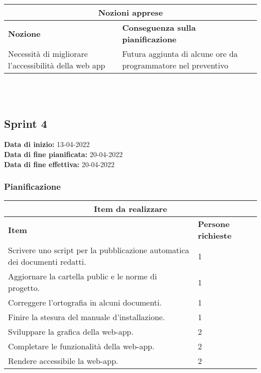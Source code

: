 \documentclass[a4paper, 12pt]{article}
\begin{document}
\begin{center}
    \begin{tabularx}{\textwidth}{|X|X|}
        \hline
        \multicolumn{2}{|c|}{\textbf{Nozioni apprese}}\\
        \hline
        \hline
        \textbf{Nozione} & \textbf{Conseguenza sulla pianificazione}\\
        \hline
        Necessità di migliorare l'accessibilità della web app & Futura aggiunta di alcune ore da programmatore nel preventivo \\
        \hline
    \end{tabularx}\\[8pt]
    \mbox{}\\
\end{center}

\subsection{Sprint 4}
\textbf{Data di inizio:} 13-04-2022\\
\textbf{Data di fine pianificata:} 20-04-2022\\
\textbf{Data di fine effettiva:} 20-04-2022

\subsubsection{Pianificazione}\mbox{}

\begin{center}
    \begin{tabularx}{\textwidth}{|X|X|}
        \hline
        \multicolumn{2}{|c|}{\textbf{Item da realizzare}}\\
        \hline
        \hline
        \textbf{Item} & \textbf{Persone richieste}\\
        \hline
        Scrivere uno script per la pubblicazione automatica dei documenti redatti. & 1\\
        \hline
        Aggiornare la cartella public e le norme di progetto. & 1\\
        \hline
        Correggere l’ortografia in alcuni documenti. & 1\\
        \hline
        Finire la stesura del manuale d'installazione. & 1\\
        \hline
		Sviluppare la grafica della web-app. & 2 \\
		\hline
		Completare le funzionalità della web-app. & 2 \\
		\hline
		Rendere accessibile la web-app. & 2 \\
		\hline
    \end{tabularx}\\[8pt]
    \mbox{}\\
\end{center}
\end{document}
